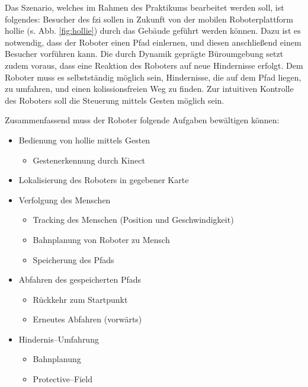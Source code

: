 Das Szenario, welches im Rahmen des Praktikums bearbeitet werden soll, ist folgendes:
Besucher des \gls{fzi} sollen in Zukunft von der mobilen Roboterplattform \gls{hollie} (s. Abb. \ref{fig:hollie}) durch das Gebäude geführt werden können.
Dazu ist es notwendig, dass der Roboter einen Pfad einlernen, und diesen anschließend einem Besucher vorführen kann.
Die durch Dynamik geprägte Büroumgebung setzt zudem voraus, dass eine Reaktion des Roboters auf neue Hindernisse erfolgt.
Dem Roboter muss es selbstständig möglich sein, Hindernisse, die auf dem Pfad liegen, zu umfahren, und einen kolissionsfreien Weg zu finden.
Zur intuitiven Kontrolle des Roboters soll die Steuerung mittels Gesten möglich sein.

Zusammenfassend muss der Roboter folgende Aufgaben bewältigen können:

\begin{itemize}
  \item Bedienung von \gls{hollie} mittels Gesten
	\begin{itemize}
	\item Gestenerkennung durch Kinect
	\end{itemize}
  \item Lokalisierung des Roboters in gegebener Karte
  \item Verfolgung des Menschen
	\begin{itemize}
	  \item Tracking des Menschen (Position und Geschwindigkeit)
	  \item Bahnplanung von Roboter zu Mensch
	  \item Speicherung des Pfads
	\end{itemize}
  \item Abfahren des gespeicherten Pfads
	\begin{itemize}
	  \item Rückkehr zum Startpunkt
	  \item Erneutes Abfahren (vorwärts)
	\end{itemize}
  \item Hindernis--Umfahrung
	\begin{itemize}
	  \item Bahnplanung
	  \item Protective--Field
	\end{itemize}
\end{itemize}

